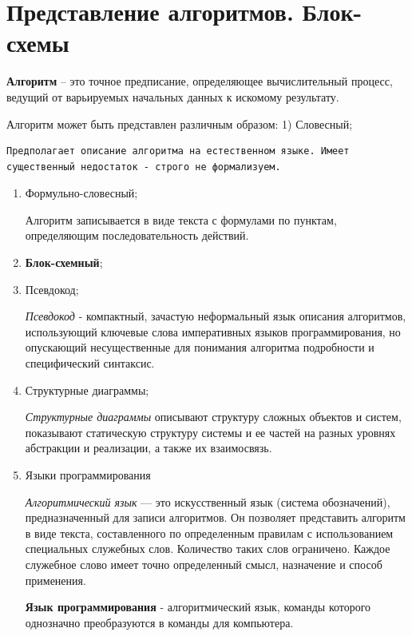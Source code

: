 \section{Представление алгоритмов.
Блок-схемы}\label{ux43fux440ux435ux434ux441ux442ux430ux432ux43bux435ux43dux438ux435-ux430ux43bux433ux43eux440ux438ux442ux43cux43eux432.-ux431ux43bux43eux43a-ux441ux445ux435ux43cux44b}

\textbf{Алгоритм} -- это точное предписание, определяющее вычислительный
процесс, ведущий от варьируемых начальных данных к искомому результату.

Алгоритм может быть представлен различным образом: 1) Словесный;

\begin{verbatim}
Предполагает описание алгоритма на естественном языке. Имеет существенный недостаток - строго не формализуем.
\end{verbatim}

\begin{enumerate}
\def\labelenumi{\arabic{enumi})}
\setcounter{enumi}{1}
\item
  Формульно-словесный;

  Алгоритм записывается в виде текста с формулами по пунктам,
  определяющим последовательность действий.
\item
  \textbf{Блок-схемный};
\item
  Псевдокод;

  \emph{Псевдокод} - компактный, зачастую неформальный язык описания
  алгоритмов, использующий ключевые слова императивных языков
  программирования, но опускающий несущественные для понимания алгоритма
  подробности и специфический синтаксис.
\item
  Структурные диаграммы;

  \emph{Структурные диаграммы} описывают структуру сложных объектов и
  систем, показывают статическую структуру системы и ее частей на разных
  уровнях абстракции и реализации, а также их взаимосвязь.
\item
  Языки программирования

  \emph{Алгоритмический язык} --- это искусственный язык (система
  обозначений), предназначенный для записи алгоритмов. Он позволяет
  представить алгоритм в виде текста, составленного по определенным
  правилам с использованием специальных служебных слов. Количество таких
  слов ограничено. Каждое служебное слово имеет точно определенный
  смысл, назначение и способ применения.

  \textbf{Язык программирования} - алгоритмический язык, команды
  которого однозначно преобразуются в команды для компьютера.
\end{enumerate}

